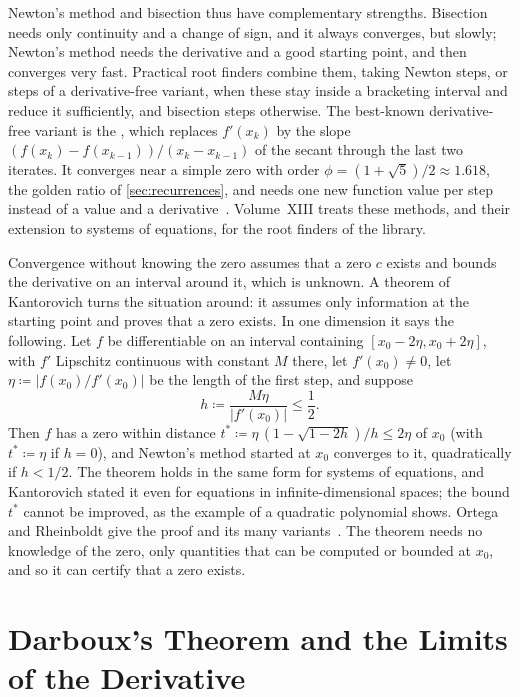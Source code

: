 Newton's method and bisection thus have complementary strengths. Bisection needs only continuity and a change of sign, and it always converges, but slowly; Newton's method needs the derivative and a good starting point, and then converges very fast. Practical root finders combine them, taking Newton steps, or steps of a derivative-free variant, when these stay inside a bracketing interval and reduce it sufficiently, and bisection steps otherwise. The best-known derivative-free variant is the , which replaces $f'(x_k)$ by the slope $(f(x_k)-f(x_{k-1}))/(x_k-x_{k-1})$ of the secant through the last two iterates. It converges near a simple zero with order $\phi=(1+\sqrt5)/2\approx1.618$, the golden ratio of \cref{sec:recurrences}, and needs one new function value per step instead of a value and a derivative~\cite{suli2003}. Volume~XIII treats these methods, and their extension to systems of equations, for the root finders of the library.

\begin{note}{Convergence without knowing the zero}
 assumes that a zero $c$ exists and bounds the derivative on an interval around it, which is unknown. A theorem of Kantorovich turns the situation around: it assumes only information at the starting point and proves that a zero exists. In one dimension it says the following. Let $f$ be differentiable on an interval containing $[x_0-2\eta,x_0+2\eta]$, with $f'$ Lipschitz continuous with constant $M$ there, let $f'(x_0)\ne0$, let $\eta\coloneqq|f(x_0)/f'(x_0)|$ be the length of the first step, and suppose
\[
h\coloneqq\frac{M\eta}{|f'(x_0)|}\le\frac12 .
\]
Then $f$ has a zero within distance $t^*\coloneqq\eta\,(1-\sqrt{1-2h})/h\le2\eta$ of $x_0$ (with $t^*\coloneqq\eta$ if $h=0$), and Newton's method started at $x_0$ converges to it, quadratically if $h<1/2$. The theorem holds in the same form for systems of equations, and Kantorovich stated it even for equations in infinite-dimensional spaces; the bound $t^*$ cannot be improved, as the example of a quadratic polynomial shows. Ortega and Rheinboldt give the proof and its many variants~\cite{ortega2000}. The theorem needs no knowledge of the zero, only quantities that can be computed or bounded at $x_0$, and so it can certify that a zero exists.
\end{note}

\section{Darboux's Theorem and the Limits of the Derivative}
\label{sec:darboux}

